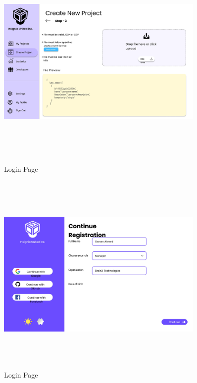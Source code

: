 \begin{figure}[H]
\includegraphics[height=10cm, width=0.9\textwidth]{./images/prototype/0014}
\centering 
\caption{Login Page}
\label{fig:prototype1}

\includegraphics[height=10cm, width=0.9\textwidth]{./images/prototype/0015}
\centering 
\caption{Login Page}
\label{fig:prototype1}
\end{figure}

